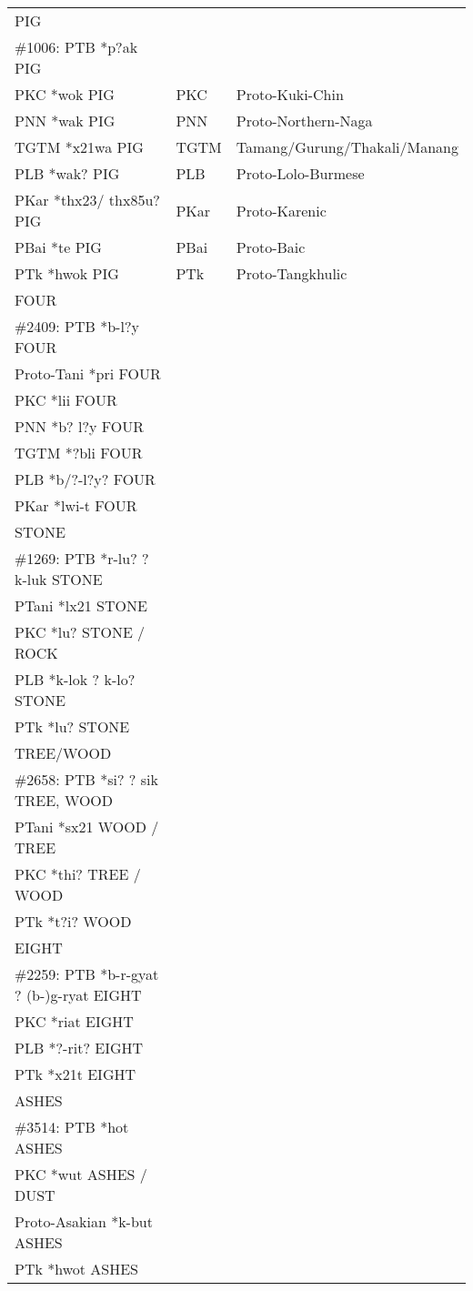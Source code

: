 \begin{tabular}{l l l}
PIG   \\
\#1006: PTB *p?ak PIG  \\
PKC *wok PIG & PKC & Proto-Kuki-Chin \\
PNN *wak PIG  & PNN & Proto-Northern-Naga\\
TGTM *x21wa PIG  & TGTM & Tamang/Gurung/Thakali/Manang\\
PLB *wak? PIG  & PLB & Proto-Lolo-Burmese\\
PKar *thx23/ thx85u?  PIG & PKar & Proto-Karenic\\
PBai *te PIG  & PBai & Proto-Baic\\
PTk *hwok PIG &   PTk & Proto-Tangkhulic\\

FOUR \\
\#2409: PTB *b-l?y FOUR \\
Proto-Tani *pri FOUR \\
PKC *lii FOUR \\
PNN *b? l?y FOUR \\
TGTM *?bli FOUR \\
PLB *b/?-l?y? FOUR \\
PKar *lwi-t FOUR \\

STONE \\
\#1269: PTB *r-lu? ? k-luk STONE \\
PTani *lx21 STONE \\
PKC *lu? STONE / ROCK \\
PLB *k-lok ? k-lo? STONE \\
PTk *lu? STONE \\

TREE/WOOD \\
\#2658: PTB *si? ? sik TREE, WOOD \\
PTani *sx21 WOOD / TREE \\
PKC *thi? TREE / WOOD \\
PTk *t?i? WOOD \\

EIGHT \\
\#2259: PTB *b-r-gyat ? (b-)g-ryat EIGHT \\
PKC *riat EIGHT \\
PLB *?-rit? EIGHT \\
PTk *x21t EIGHT \\

ASHES \\
\#3514: PTB *hot ASHES \\
PKC *wut ASHES / DUST \\
Proto-Asakian *k-but ASHES	 \\
PTk *hwot ASHES \\
\end{tabular}

